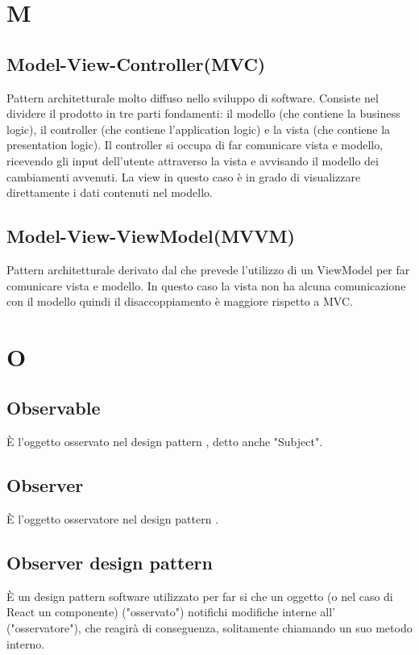 \section*{M}
\subsection*{Model-View-Controller(MVC)}
Pattern architetturale molto diffuso nello sviluppo di software. Consiste nel dividere il prodotto in tre parti fondamenti: il modello (che contiene la business logic), il controller (che contiene l'application logic) e la vista (che contiene la presentation logic). Il controller si occupa di far comunicare vista e modello, ricevendo gli input dell'utente attraverso la vista e avvisando il modello dei cambiamenti avvenuti. La view in questo caso è in grado di visualizzare direttamente i dati contenuti nel modello.
\subsection*{Model-View-ViewModel(MVVM)}
Pattern architetturale derivato dal  che prevede l'utilizzo di un ViewModel per far comunicare vista e modello. In questo caso la vista non ha alcuna comunicazione con il modello quindi il disaccoppiamento è maggiore rispetto a MVC.


\section*{O}
\subsection*{Observable}
È l'oggetto osservato nel design pattern , detto anche "Subject". 
\subsection*{Observer}
È l'oggetto osservatore nel design pattern .
\subsection*{Observer design pattern}
È un design pattern software utilizzato per far si che un oggetto (o nel caso di React un componente) ("osservato") notifichi modifiche interne all' ("osservatore"), che reagirà di conseguenza, solitamente chiamando un suo metodo interno.

